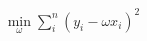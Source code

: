 \documentclass[preview]{standalone}
\begin{document}
\begin{align*}
\min_\omega \sum_i^n (y_i -\omega x_i)^2
\end{align*}
\end{document}
